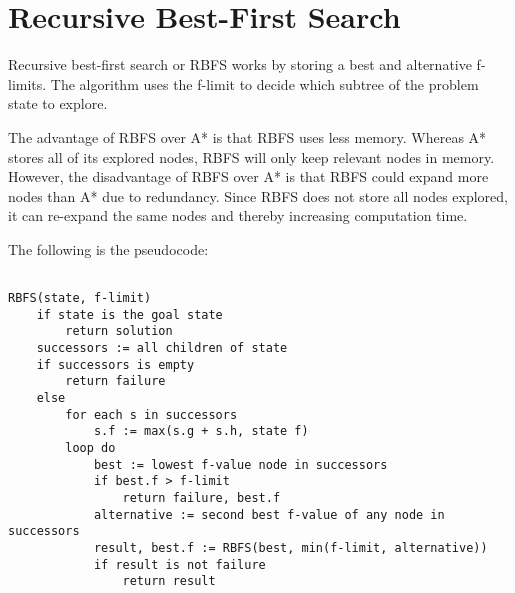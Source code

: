 \section{Recursive Best-First Search}

Recursive best-first search or RBFS works by storing a best and alternative f-limits. The algorithm uses the f-limit to decide which subtree of the problem state to explore.

The advantage of RBFS over A* is that RBFS uses less memory. Whereas A* stores all of its explored nodes, RBFS will only keep relevant nodes in memory. However, the disadvantage of RBFS over A* is that RBFS could expand more nodes than A* due to redundancy. Since RBFS does not store all nodes explored, it can re-expand the same nodes and thereby increasing computation time.

The following is the pseudocode:

\begin{verbatim}

RBFS(state, f-limit)
    if state is the goal state 
        return solution
    successors := all children of state
    if successors is empty
        return failure
    else
        for each s in successors
            s.f := max(s.g + s.h, state f)
        loop do
            best := lowest f-value node in successors
            if best.f > f-limit
                return failure, best.f
            alternative := second best f-value of any node in successors
            result, best.f := RBFS(best, min(f-limit, alternative))
            if result is not failure
                return result
\end{verbatim}

